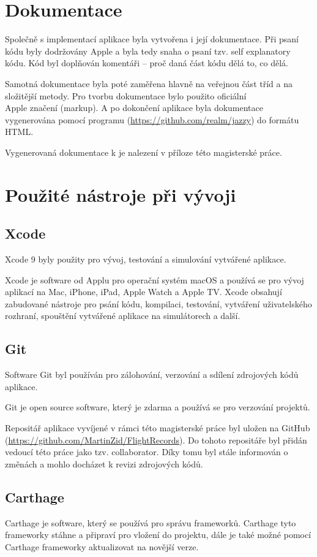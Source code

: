 \documentclass[thesis=M,czech]{FITthesis}[2012/06/26]
\begin{document}
\section{Dokumentace}
Společně s implementací aplikace byla vytvořena i její dokumentace. Při psaní kódu byly dodržovány Apple  a byla tedy snaha o psaní tzv. self explanatory kódu. Kód byl doplňován komentáři -- proč daná část kódu dělá to, co dělá. 

Samotná dokumentace byla poté zaměřena hlavně na veřejnou část tříd a na složitější metody. Pro tvorbu dokumentace bylo použito oficiální \\Apple značení (markup). A po dokončení aplikace byla dokumentace vygenerována pomocí programu  (\url{https://github.com/realm/jazzy}) do formátu HTML.

Vygenerovaná dokumentace k je nalezení v příloze této magisterské práce. 

\section{Použité nástroje při vývoji}
\subsection{Xcode}
Xcode 9 byly použity pro vývoj, testování a simulování vytvářené aplikace. 

Xcode je software od Applu pro operační systém macOS a používá se pro vývoj aplikací na Mac, iPhone, iPad, Apple Watch a Apple TV. Xcode obsahují zabudované nástroje pro psání kódu, kompilaci, testování, vytváření uživatelského rozhraní, spouštění vytvářené aplikace na simulátorech a další. \cite{Xcode}

\subsection{Git}
Software Git byl používán pro zálohování, verzování a sdílení zdrojových kódů aplikace. 

Git je open source software, který je zdarma a používá se pro verzování projektů. \cite{git}

Repositář aplikace vyvíjené v rámci této magisterské práce byl uložen na GitHub (\url{https://github.com/MartinZid/FlightRecords}). Do tohoto repositáře byl přidán vedoucí této práce jako tzv. collaborator. Díky tomu byl stále informován o změnách a mohlo docházet k revizi zdrojových kódů.

\subsection{Carthage}
Carthage je software, který se používá pro správu frameworků. Carthage tyto frameworky stáhne a připraví pro vložení do projektu, dále je také možné pomocí Carthage frameworky aktualizovat na novější verze. \cite{carthage}
\end{document}
